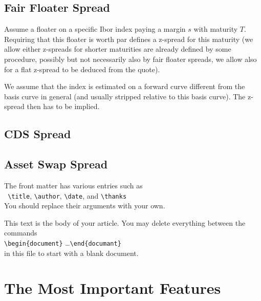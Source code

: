 \documentclass{article}%
\begin{document}
\subsection{Fair Floater Spread}

Assume a floater on a specific Ibor index paying a margin $s$ with maturity $T$. Requiring that this floater is worth par defines a z-spread for this maturity
(we allow either z-spreads for shorter maturities are already defined by some procedure, possibly but not necessarily also by fair floater spreads, we allow
also for a flat z-spread to be deduced from the quote).

We assume that the index is estimated on a forward curve different from the basis curve in general (and usually stripped relative to this basis curve). The 
z-spread then has to be implied.


\subsection{CDS Spread}



\subsection{Asset Swap Spread}





 

\noindent The front matter has various entries such as\\
\hspace*{\fill}\verb" \title", \verb"\author", \verb"\date", and
\verb"\thanks"\hspace*{\fill}\\
You should replace their arguments with your own.

This text is the body of your article. You may delete everything between the commands\\
\hspace*{\fill} \verb"\begin{document}" \ldots \verb"\end{documant}"
\hspace*{\fill}\\in this file to start with a blank document.


\section{The Most Important Features}
\end{document}
